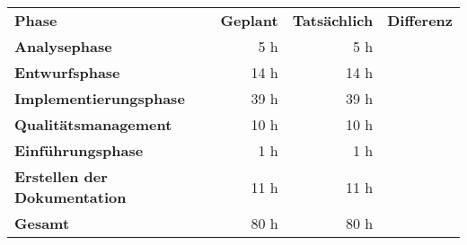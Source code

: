 \begin{tabular}{lrrr}
\rowcolor{heading}\textbf{Phase} & \textbf{Geplant} & \textbf{Tatsächlich} & \textbf{Differenz} \\
\textbf{Analysephase} & 5 h  & 5 h  &  \\
\rowcolor{odd}\textbf{Entwurfsphase} & 14 h   & 14 h  &  \\
\textbf{Implementierungsphase} & 39 h  & 39 h  &  \\
\rowcolor{odd}\textbf{Qualitätsmanagement} & 10 h   & 10 h   &  \\
\textbf{Einführungsphase} & 1 h   & 1 h   &  \\
\rowcolor{odd}\textbf{Erstellen der Dokumentation} & 11 h   & 11 h  &  \\
\hline
\hline
\rowcolor{odd}\textbf{Gesamt} & 80 h  & 80 h  &  \\
\end{tabular}
